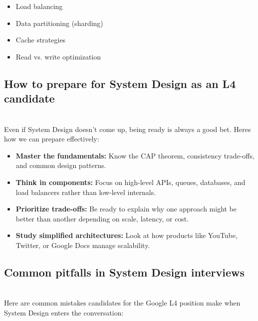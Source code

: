 \begin{itemize}
\item
\protect{}\label{FAqLIy7yTiFe0sX-o3-Ls}
Load balancing
\item
\protect{}\label{2FRqBestltPMTcCKd0djG}
Data partitioning (sharding)
\item
\protect{}\label{t1YasSuhTOKwAtAsjsq4s}
Cache strategies
\item
\protect{}\label{KIR4QRN21fhF0J7hP9cMy}
Read vs. write optimization
\end{itemize}

\subsection{How to prepare for System Design as an L4 candidate}\label{LMVAUSrHryH1EhTmERQzY}
\\
Even if System Design doesn't come up, being ready is always a good bet. Here\textquotesingle s how we can prepare effectively:

\begin{itemize}
\item
\protect{}\label{tU7I5Und3VfhMDwguGL3Z}
\textbf{Master the fundamentals:} Know the CAP theorem, consistency trade-offs, and common design patterns.
\item
\protect{}\label{t9Pluy7zmkIbjFXn_r-P-}
\textbf{Think in components:} Focus on high-level APIs, queues, databases, and load balancers rather than low-level internals.
\item
\protect{}\label{HU795PLRLXuj7oZ47tBqb}
\textbf{Prioritize trade-offs:} Be ready to explain why one approach might be better than another depending on scale, latency, or cost.
\item
\protect{}\label{QBP4ND0iMQCPf5e4ICzp8}
\textbf{Study simplified architectures:} Look at how products like YouTube, Twitter, or Google Docs manage scalability.
\end{itemize}

\subsection{Common pitfalls in System Design interviews}\label{MNsRocDwt5eqPgL7x1fBy}
\\
Here are common mistakes candidates for the Google L4 position make when System Design enters the conversation:


